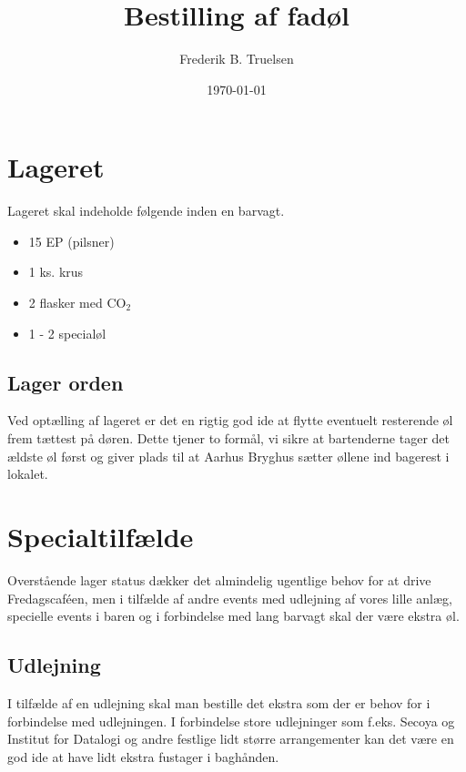 

\title{Bestilling af fadøl}
\date{\today}
\author{Frederik B. Truelsen}



\maketitle

\section{Lageret}

Lageret skal indeholde følgende inden en barvagt.

\begin{itemize}
\item 15 EP (pilsner)
\item 1 ks. krus
\item 2 flasker med CO$_{2}$
\item 1 - 2 specialøl
\end{itemize} 

\subsection{Lager orden}

Ved optælling af lageret er det en rigtig god ide at flytte eventuelt resterende øl frem tættest på døren.
Dette tjener to formål, vi sikre at bartenderne tager det ældste øl først og giver plads til at Aarhus Bryghus
sætter øllene ind bagerest i lokalet.

\section{Specialtilfælde}

Overstående lager status dækker det almindelig ugentlige behov for at drive Fredagscaféen,
men i tilfælde af andre events med udlejning af vores lille anlæg, specielle events i baren og
i forbindelse med lang barvagt skal der være ekstra øl.

\subsection{Udlejning}

I tilfælde af en udlejning skal man bestille det ekstra som der er behov for i forbindelse med
udlejningen. I forbindelse store udlejninger som f.eks. Secoya og Institut for Datalogi og andre
festlige lidt større arrangementer  kan det være en god ide at have lidt ekstra fustager i baghånden.

